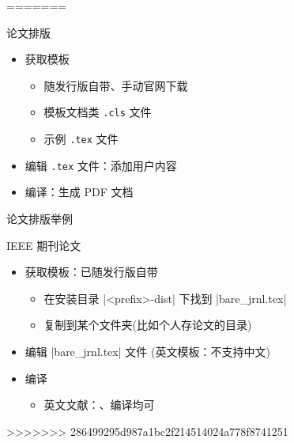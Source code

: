 =======
    
  \begin{frame}{论文排版}
    \begin{itemize}
      \item 获取模板
        \begin{itemize}
          \item 随发行版自带、手动官网下载
          \item 模板文档类 \texttt{.cls} 文件
          \item 示例 \texttt{.tex} 文件
        \end{itemize}
      \item 编辑 \texttt{.tex} 文件：添加用户内容
      \item 编译：生成 PDF 文档
    \end{itemize}
  \end{frame}
  
  \begin{frame}[fragile]{论文排版举例}
    \begin{exampleblock}{IEEE 期刊论文}
      \begin{itemize}
        \item 获取模板：已随发行版自带
          \begin{itemize}
            \item 在安装目录 |<prefix>\texlive{}\texmf-dist\doc\latex\IEEEtran|
              下找到 |bare_jrnl.tex|
            \item 复制到某个文件夹(比如个人存论文的目录)
          \end{itemize}
        \item 编辑 |bare_jrnl.tex| 文件 (英文模板：不支持中文)
        \item 编译
          \begin{itemize}
            \item 英文文献：\XeLaTeX 、\pdfLaTeX 编译均可
          \end{itemize}
      \end{itemize}
    \end{exampleblock}
  \end{frame}



>>>>>>> 286499295d987a1bc2f214514024a778f8741251
